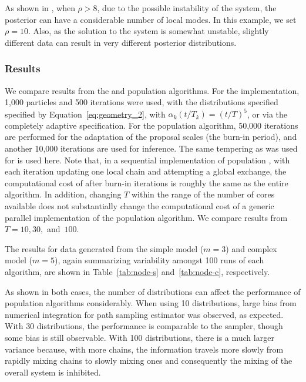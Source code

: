 As shown in \cite{Calderhead:2009bd}, when $\rho > 8$, due to the possible
instability of the \ode system, the posterior can have a considerable number
of local modes. In this example, we set $\rho = 10$. Also, as the solution to
the \ode system is somewhat unstable, slightly different data can result in
very different posterior distributions.

\subsubsection{Results}

We compare results from the \smc[2] and population \mcmc algorithms. For the
\smc implementation, 1,000 particles and 500 iterations were used, with the
distributions specified specified by Equation~\eqref{eq:geometry_2}, with
$\alpha_k(t/T_k) = (t/T)^5$, or via the completely adaptive specification. For
the population \mcmc algorithm, 50,000 iterations are performed for the
adaptation of the proposal scales (the burn-in period), and another 10,000
iterations are used for inference. The same tempering as was used for \smc is
used here. Note that, in a sequential implementation of population \mcmc, with
each iteration updating one local chain and attempting a global exchange, the
computational cost of after burn-in iterations is roughly the same as the
entire \smc algorithm. In addition, changing $T$ within the range of the
number of cores available does not substantially change the computational cost
of a generic parallel implementation of the population \mcmc algorithm. We
compare results from $T = 10,30,$ and~$100$.

The results for data generated from the simple model ($m = 3$) and complex
model ($m = 5$), again summarizing variability amongst 100 runs of each
algorithm, are shown in Table~\ref{tab:node-s} and~\ref{tab:node-c},
respectively.




As shown in both cases, the number of distributions can affect the performance
of population \mcmc algorithms considerably. When using 10 distributions,
large bias from numerical integration for path sampling estimator was
observed, as expected. With 30 distributions, the performance is comparable to
the \smc[2] sampler, though some bias is still observable. With 100
distributions, there is a much larger variance because, with more chains, the
information travels more slowly from rapidly mixing chains to slowly mixing
ones and consequently the mixing of the overall system is inhibited.

